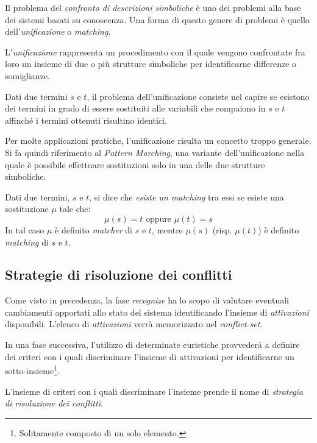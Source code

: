 Il problema del \emph{confronto di descrizioni simboliche} è uno dei problemi alla base dei sistemi basati su conoscenza. Una forma di questo genere di problemi è quello dell'\emph{unificazione} o \emph{matching}.

L'\emph{unificazione} rappresenta un procedimento con il quale vengono confrontate fra loro un insieme di due o più strutture simboliche per identificarne differenze o somiglianze.~\cite{ferilli200}

Dati due termini $s$ e $t$, il problema dell'unificazione consiste nel capire se esistono dei termini in grado di essere sostituiti alle variabili che compaiono in $s$ e $t$ affinché i termini ottenuti risultino identici.~\cite{ferilli200}

Per molte applicazioni pratiche, l'unificazione risulta un concetto troppo generale. Si fa quindi riferimento al \emph{Pattern Marching}, una variante dell'unificazione nella quale è possibile effettuare sostituzioni solo in una delle due strutture simboliche.~\cite{ferilli200}


\begin{defn}
Dati due termini, $s$ e $t$, si dice che \emph{esiste un matching} tra essi se esiste una sostituzione $\mu$ tale che:
\begin{equation}
\mu(s)=t \text{ oppure } \mu(t)=s
\end{equation}
In tal caso $\mu$ è definito \emph{matcher} di $s$ e $t$, mentre $\mu(s)$ (risp. $\mu(t)$) è definito \emph{matching} di $s$ e $t$.
\end{defn}

\subsection{Strategie di risoluzione dei conflitti}\label{par:strategies}

Come visto in precedenza, la fase \emph{recognize} ha lo scopo di valutare eventuali cambiamenti apportati allo stato del sistema identificando l'insieme di \emph{attivazioni} disponibili. L'elenco di \emph{attivazioni} verrà memorizzato nel \emph{conflict-set}. 

In una fase successiva, l'utilizzo di determinate euristiche provvederà a definire dei criteri con i quali discriminare l'insieme di attivazioni per identificarne un sotto-insieme\footnote{Solitamente composto di un solo elemento.}.

L'insieme di criteri con i quali discriminare l'insieme prende il nome di \emph{strategia di risoluzione dei conflitti}.

